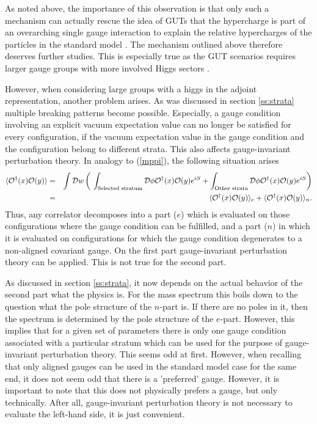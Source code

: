 \documentclass[final,12pt]{article}
\newcommand*{\no}{\noindent}
\newcommand*{\bea}{\begin{eqnarray}}
\newcommand*{\eea}{\end{eqnarray}}
\newcommand*{\pref}[1]{(\ref{#1})}
\newcommand*{\nn}{\nonumber}
\newcommand*{\1}{1\!\!\!\bot}
\newcommand*{\op}{{\cal O}}
\begin{document}
As noted above, the importance of this observation is that only such a mechanism can actually rescue the idea of GUTs that the hypercharge is part of an overarching single gauge interaction to explain the relative hypercharges of the particles in the standard model \cite{Langacker:1980js}. The mechanism outlined above therefore deserves further studies. This is especially true as the GUT scenarios requires larger gauge groups with more involved Higgs sectors \cite{Langacker:1980js}.

However, when considering large groups with a higgs in the adjoint representation, another problem arises. As was discussed in section \ref{ss:strata} multiple breaking patterns become possible. Especially, a gauge condition involving an explicit vacuum expectation value can no longer be satisfied for every configuration, if the vacuum expectation value in the gauge condition and the configuration belong to different strata. This also affects gauge-invariant perturbation theory. In analogy to \pref{mppi}, the following situation arises \cite{Maas:2017xzh}
\bea
\langle \op^\dagger(x) \op(y)\rangle&=&\int{\cal D}w\left(~\int_\text{Selected stratum}{\cal D}\phi \op^\dagger(x)\op(y)e^{iS}+\int_\text{Other strata}{\cal D}\phi\op^\dagger(x)\op(y)e^{iS}\right)\nonumber\\
&=&\langle \op^\dagger(x)\op(y)\rangle_e+\langle \op^\dagger(x) \op(y)\rangle_n\nn.
\eea
\no Thus, any correlator decomposes into a part ($e$) which is evaluated on those configurations where the gauge condition can be fulfilled, and a part ($n$) in which it is evaluated on configurations for which the gauge condition degenerates to a non-aligned covariant gauge. On the first part gauge-invariant perturbation theory can be applied. This is not true for the second part.

As discussed in section \ref{ss:strata}, it now depends on the actual behavior of the second part what the physics is. For the mass spectrum this boils down to the question what the pole structure of the $n$-part is. If there are no poles in it, then the spectrum is determined by the pole structure of the $e$-part. However, this implies that for a given set of parameters there is only one gauge condition associated with a particular stratum which can be used for the purpose of gauge-invariant perturbation theory. This seems odd at first. However, when recalling that only aligned gauges can be used in the standard model case for the same end, it does not seem odd that there is a 'preferred' gauge. However, it is important to note that this does not physically prefers a gauge, but only technically. After all, gauge-invariant perturbation theory is not necessary to evaluate the left-hand side, it is just convenient.
\end{document}
